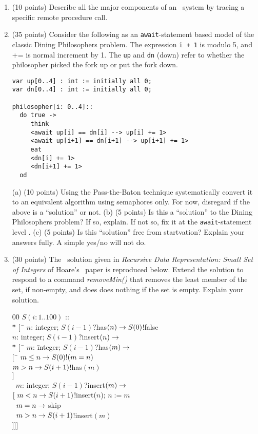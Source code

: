 \begin{enumerate}
\item (10 points)
Describe all the major components of an \RPC\ system by
tracing a specific remote procedure call.

\item (35 points) Consider the following as an {\tt await}-statement
based model of the classic Dining Philosophers problem.  The
expression {\tt i + 1} is modulo 5, and += is normal increment by 1.
The {\tt up} and {\tt dn} (down) refer to whether the philosopher
picked the fork up or put the fork down.

\begin{verbatim}
var up[0..4] : int := initially all 0;
var dn[0..4] : int := initially all 0;

philosopher[i: 0..4]::
  do true ->
     think
     <await up[i] == dn[i] --> up[i] += 1>
     <await up[i+1] == dn[i+1] --> up[i+1] += 1>
     eat
     <dn[i] += 1>
     <dn[i+1] += 1>
  od
\end{verbatim}

\noindent 
(a) (10 points) Using the Pass-the-Baton technique systematically
convert it to an equivalent algorithm using semaphores only.  For now,
disregard if the above is a ``solution'' or not. (b) (5 points) Is
this a ``solution'' to the Dining Philosophers problem?  If so,
explain.  If not so, fix it at the {\tt await}-statement level .  (c)
(5 points) Is this ``solution'' free from startvation?  Explain your
answers fully.  A simple yes/no will not do.


\item (30 points) The \CSP\ solution given in {\sl Recursive Data
Representation: Small Set of Integers} of Hoare's \CSP\ paper is
reproduced below.  Extend the solution to respond to a command {\it
removeMin()} that removes the least member of the set, if non-empty,
and does does nothing if the set is empty.  Explain your solution.

\begin{tabbing}
00\=\kill
$S(i: 1 .. 100)$ ::\+\\
$ *$\= $[\ $ \= $n$: integer; $S(i-1)$?has$(n) \rightarrow S(0)$!false\+\\
 \fat\> $n$: integer; $S(i-1)$?insert$(n) \rightarrow$\+\\
     $*$\= $[\ $ \= $m$: \= integer; $S(i-1)$?has$(m) \rightarrow$\+\+\\
       $[$\ \= $m \leq n \rightarrow S(0)!(m = n)$\\
       \fat \> $m > n \rightarrow S(i+1)$!has$(m)$\\
       $]$ \-\-\\
  \> \fat\ $m$: integer; $S(i-1)$?insert$(m) \rightarrow$\+\+\\
    $[\  m < n \rightarrow S(i+1)$!insert($n$); $n := m$\\
    \fat\ $m = n \rightarrow $ skip\\
    \fat\ $m > n \rightarrow S(i+1)$!insert$(m)$\-\-\-\\
]\>\>]\>]\\
\end{tabbing}
\end{enumerate}

